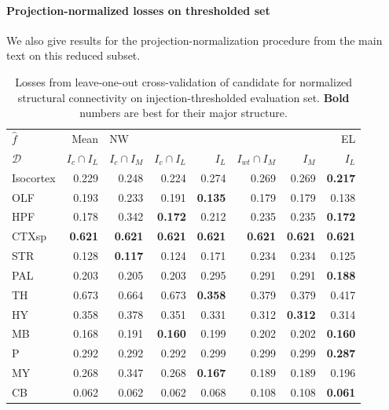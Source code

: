 \newpage
\paragraph{Projection-normalized losses on thresholded set}

We also give results for the projection-normalization procedure from the main text on this reduced subset.

\begin{table}[H]
\begin{tabular}{lrrrrrrr}
\toprule
$\widehat f$ &           Mean & \multicolumn{5}{l}{NW} &     EL \\
$\mathcal D$ & $I_c \cap I_L$ & $I_c \cap I_M$ & $I_c \cap I_L$ &  $I_L$ & $I_{wt} \cap I_M$ &  $I_M$ &  $I_L$ \\
\midrule
Isocortex &          0.229 &          0.248 &          0.224 &  0.274 &             0.269 &  0.269 &  \textbf{0.217} \\
OLF       &          0.193 &          0.233 &          0.191 &   \textbf{0.135} &             0.179 &  0.179 &  0.138 \\
HPF       &          0.178 &          0.342 &          \textbf{ 0.172 }&  0.212 &             0.235 &  0.235 &   \textbf{0.172} \\
CTXsp     &          \textbf{ 0.621 }&      \textbf{     0.621 }&       \textbf{    0.621} &   \textbf{0.621 }&            \textbf{  0.621} &   \textbf{0.621 }&   \textbf{0.621 }\\
STR       &          0.128 &         \textbf{  0.117} &          0.124 &  0.171 &             0.234 &  0.234 &  0.125 \\
PAL       &          0.203 &          0.205 &          0.203 &  0.295 &             0.291 &  0.291 & \textbf{  0.188 }\\
TH        &          0.673 &          0.664 &          0.673 &   \textbf{0.358} &             0.379 &  0.379 &  0.417 \\
HY        &          0.358 &          0.378 &          0.351 &  0.331 &             0.312 &   \textbf{0.312} &  0.314 \\
MB        &          0.168 &          0.191 &         \textbf{ 0.160 }&  0.199 &             0.202 &  0.202 & \textbf{ 0.160} \\
P         &          0.292 &          0.292 &          0.292 &  0.299 &             0.299 &  0.299 &\textbf{  0.287 }\\
MY        &          0.268 &          0.347 &          0.268 &  \textbf{0.167} &             0.189 &  0.189 &  0.196 \\
CB        &          0.062 &          0.062 &          0.062 &  0.068 &             0.108 &  0.108 &  \textbf{0.061 }\\
\bottomrule
\end{tabular}
\caption{Losses from leave-one-out cross-validation of candidate for normalized structural connectivity on injection-thresholded evaluation set. \textbf{Bold} numbers are best for their major structure.}
\label{tab:crossvalidation}
\end{table}




